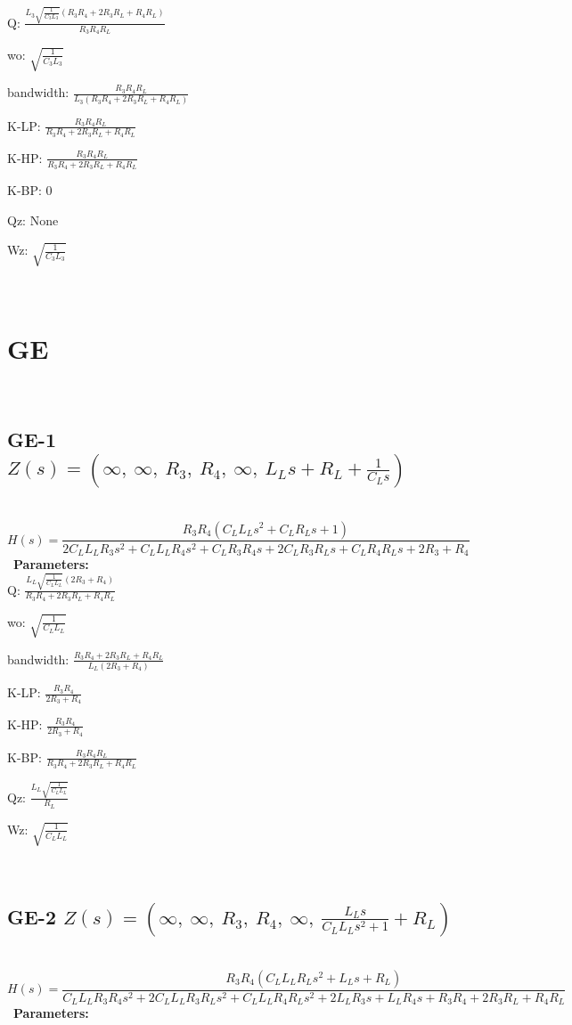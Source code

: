 \documentclass{article}
\begin{document}
Q: $\frac{L_{3} \sqrt{\frac{1}{C_{3} L_{3}}} \left(R_{3} R_{4} + 2 R_{3} R_{L} + R_{4} R_{L}\right)}{R_{3} R_{4} R_{L}}$\ 

wo: $\sqrt{\frac{1}{C_{3} L_{3}}}$\ 

bandwidth: $\frac{R_{3} R_{4} R_{L}}{L_{3} \left(R_{3} R_{4} + 2 R_{3} R_{L} + R_{4} R_{L}\right)}$\ 

K-LP: $\frac{R_{3} R_{4} R_{L}}{R_{3} R_{4} + 2 R_{3} R_{L} + R_{4} R_{L}}$\ 

K-HP: $\frac{R_{3} R_{4} R_{L}}{R_{3} R_{4} + 2 R_{3} R_{L} + R_{4} R_{L}}$\ 

K-BP: $0$\ 

Qz: $\text{None}$\ 

Wz: $\sqrt{\frac{1}{C_{3} L_{3}}}$\ 

\ 

\section{GE}\ 
\subsection{GE-1 $Z(s) = \left( \infty, \  \infty, \  R_{3}, \  R_{4}, \  \infty, \  L_{L} s + R_{L} + \frac{1}{C_{L} s}\right)$ } \ 
\textbf{\[H(s) = \frac{R_{3} R_{4} \left(C_{L} L_{L} s^{2} + C_{L} R_{L} s + 1\right)}{2 C_{L} L_{L} R_{3} s^{2} + C_{L} L_{L} R_{4} s^{2} + C_{L} R_{3} R_{4} s + 2 C_{L} R_{3} R_{L} s + C_{L} R_{4} R_{L} s + 2 R_{3} + R_{4}}\] } \ 
\textbf{Parameters:}\\ 

Q: $\frac{L_{L} \sqrt{\frac{1}{C_{L} L_{L}}} \left(2 R_{3} + R_{4}\right)}{R_{3} R_{4} + 2 R_{3} R_{L} + R_{4} R_{L}}$\ 

wo: $\sqrt{\frac{1}{C_{L} L_{L}}}$\ 

bandwidth: $\frac{R_{3} R_{4} + 2 R_{3} R_{L} + R_{4} R_{L}}{L_{L} \left(2 R_{3} + R_{4}\right)}$\ 

K-LP: $\frac{R_{3} R_{4}}{2 R_{3} + R_{4}}$\ 

K-HP: $\frac{R_{3} R_{4}}{2 R_{3} + R_{4}}$\ 

K-BP: $\frac{R_{3} R_{4} R_{L}}{R_{3} R_{4} + 2 R_{3} R_{L} + R_{4} R_{L}}$\ 

Qz: $\frac{L_{L} \sqrt{\frac{1}{C_{L} L_{L}}}}{R_{L}}$\ 

Wz: $\sqrt{\frac{1}{C_{L} L_{L}}}$\ 

\ 

\subsection{GE-2 $Z(s) = \left( \infty, \  \infty, \  R_{3}, \  R_{4}, \  \infty, \  \frac{L_{L} s}{C_{L} L_{L} s^{2} + 1} + R_{L}\right)$ } \ 
\textbf{\[H(s) = \frac{R_{3} R_{4} \left(C_{L} L_{L} R_{L} s^{2} + L_{L} s + R_{L}\right)}{C_{L} L_{L} R_{3} R_{4} s^{2} + 2 C_{L} L_{L} R_{3} R_{L} s^{2} + C_{L} L_{L} R_{4} R_{L} s^{2} + 2 L_{L} R_{3} s + L_{L} R_{4} s + R_{3} R_{4} + 2 R_{3} R_{L} + R_{4} R_{L}}\] } \ 
\textbf{Parameters:}\\ 
\end{document}
